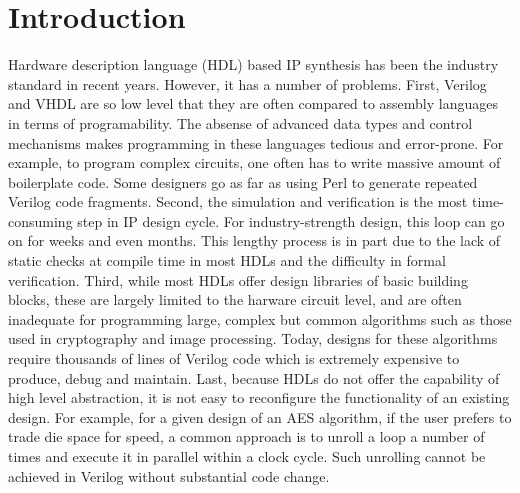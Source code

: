 \section{Introduction}

Hardware description language (HDL) based IP synthesis has been the 
industry standard in recent years.
However, it has a number of problems.
First, Verilog and VHDL are so low level that they are often compared to assembly languages
in terms of programability. The absense of advanced data types and control mechanisms makes
programming in these languages tedious and error-prone. For example, to program complex
circuits, one often has to write massive amount of boilerplate code. Some
designers go as far as using Perl to generate repeated Verilog code fragments. 
Second, the simulation and verification
is the most time-consuming step in IP design cycle. For industry-strength design, 
this loop can go on for weeks and even months. This lengthy process is in part due to
the lack of static checks at compile time in most HDLs and the difficulty in formal
verification.  Third, while most HDLs offer design libraries of basic building blocks,
these are largely limited to the harware circuit level, and are often inadequate for programming
large, complex but common algorithms such as those used in cryptography and image processing.
Today, designs for these algorithms require thousands of lines of Verilog code which is
extremely expensive to produce, debug and maintain. Last, because HDLs do not offer the 
capability of high level abstraction, it is not easy to reconfigure the functionality of an
existing design. For example, for a given design of an AES algorithm, if the user prefers
to trade die space for speed, a common approach is to unroll a loop a number of times
and execute it in parallel within a clock cycle. Such unrolling cannot be achieved
in Verilog without substantial code change.

